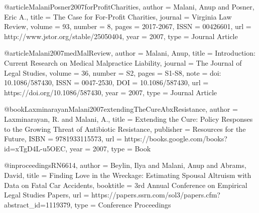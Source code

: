
@article{MalaniPosner2007forProfitCharities,
   author = {Malani, Anup and Posner, Eric A.},
   title = {The Case for For-Profit Charities},
   journal = {Virginia Law Review},
   volume = {93},
   number = {8},
   pages = {2017-2067},
   ISSN = {00426601},
   url = {http://www.jstor.org/stable/25050404},
   year = {2007},
   type = {Journal Article}
}



@article{Malani2007medMalReview,
   author = {Malani, Anup},
   title = {Introduction: Current Research on Medical Malpractice Liability},
   journal = {The Journal of Legal Studies},
   volume = {36},
   number = {S2},
   pages = {S1-S8},
   note = {doi: 10.1086/587430},
   ISSN = {0047-2530},
   DOI = {10.1086/587430},
   url = {https://doi.org/10.1086/587430},
   year = {2007},
   type = {Journal Article}
}


@book{LaxminarayanMalani2007extendingTheCureAbxResistance,
   author = {Laxminarayan, R. and Malani, A.},
   title = {Extending the Cure: Policy Responses to the Growing Threat of Antibiotic Resistance},
   publisher = {Resources for the Future},
   ISBN = {9781933115573},
   url = {https://books.google.com/books?id=xTgD4L-u5OEC},
   year = {2007},
   type = {Book}
}


@inproceedings{RN6614,
   author = {Beylin, Ilya and Malani, Anup and Abrams, David},
   title = {Finding Love in the Wreckage: Estimating Spousal Altruism with Data on Fatal Car Accidents},
   booktitle = {3rd Annual Conference on Empirical Legal Studies Papers},
   url = {https://papers.ssrn.com/sol3/papers.cfm?abstract_id=1119379},
   type = {Conference Proceedings}
}


